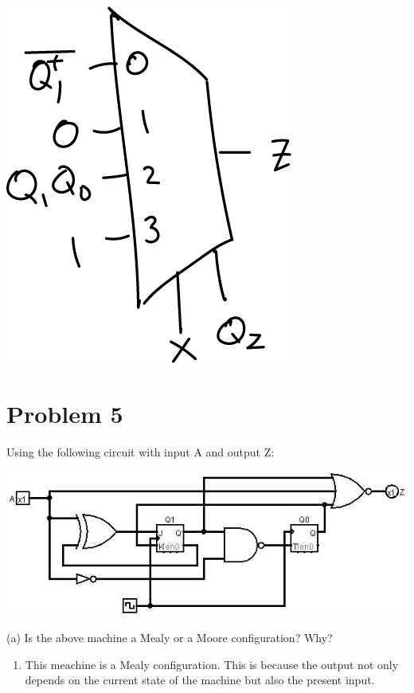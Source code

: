 \documentclass{article}
\begin{document}
    \begin{center}
        \includegraphics[scale=0.4]{Q4_4-1MUX.png}
    \end{center}

    
    \section*{Problem 5}

    Using the following circuit with input A and output Z:

    \begin{center}
        \includegraphics[scale=0.75]{Q5_Question.jpg}
    \end{center}

    (a) Is the above machine a Mealy or a Moore configuration? Why?

    \begin{enumerate}[label=\textbf{Solution:}, leftmargin=*]
        \item 
        This meachine is a Mealy configuration. This is because the output not only depends
        on the current state of the machine but also the present input.
    \end{enumerate}
\end{document}
